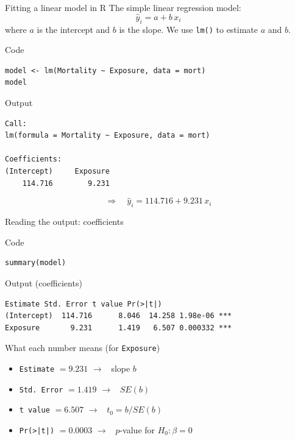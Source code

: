 \documentclass[aspectratio=169]{beamer}
\begin{document}
\begin{frame}[fragile]{Fitting a linear model in R}
The simple linear regression model:
\[
\hat{y}_i = a + b\,x_i
\]
where $a$ is the intercept and $b$ is the slope. We use \texttt{lm()} to estimate $a$ and $b$.\\
\vspace{4pt}
\begin{block}{Code}
\begin{lstlisting}
model <- lm(Mortality ~ Exposure, data = mort)
model
\end{lstlisting}
\end{block}
\begin{exampleblock}{Output}
\begin{lstlisting}[numbers=none]
Call:
lm(formula = Mortality ~ Exposure, data = mort)

Coefficients:
(Intercept)     Exposure  
    114.716        9.231  
\end{lstlisting}
\end{exampleblock}
\[
\Rightarrow \quad \hat{y}_i = 114.716 + 9.231\,x_i
\]
\end{frame}


\begin{frame}[fragile]{Reading the output: coefficients}
\begin{block}{Code}
\begin{lstlisting}
summary(model)
\end{lstlisting}
\end{block}
\begin{exampleblock}{Output (coefficients)}
\begin{lstlisting}[numbers=none]
            Estimate Std. Error t value Pr(>|t|)    
(Intercept)  114.716      8.046  14.258 1.98e-06 ***
Exposure       9.231      1.419   6.507 0.000332 ***
\end{lstlisting}
\end{exampleblock}
\begin{block}{What each number means (for \texttt{Exposure})}
\begin{itemize}
  \item \texttt{Estimate} $= 9.231$ \quad $\rightarrow$ \ slope $b$
  \item \texttt{Std. Error} $= 1.419$ \quad $\rightarrow$ \ $SE(b)$
  \item \texttt{t value} $= 6.507$ \quad $\rightarrow$ \ $t_0 = b / SE(b)$
  \item \texttt{Pr(>|t|)} $= 0.0003$ \quad $\rightarrow$ \ $p$-value for $H_0: \beta = 0$
\end{itemize}
\end{block}
\end{frame}
\end{document}
